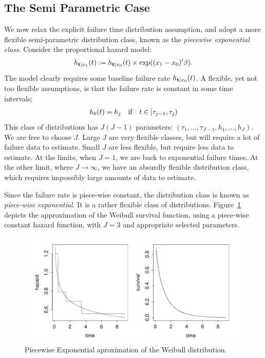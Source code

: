\subsection{The Semi Parametric Case}
We now relax the explicit failure time distribution assumption, and adopt a more flexible semi-parametric distribution class, known as the \emph{piecewise exponential class}.
Consider the proportional hazard model:
\begin{align}
	h_{\mathbf{t}|x_1} (t):=h_{\mathbf{t}|x_0} (t) \times \exp((x_1-x_0)'\beta).
\end{align}
The model clearly requires some baseline failure rate $h_{\mathbf{t}|x_0} (t)$.
A flexible, yet not too flexible assumptions, is that the failure rate is constant in some time intervals:
\begin{align}
	h_{0} (t)=h_j \quad \text{if} \quad t\in [\tau_{j-1},\tau_j)
\end{align}
This class of distributions has $J(J-1)$ parameters: $(\tau_1,\dots,\tau_{J-1},h_1,\dots,h_J)$.
We are free to choose $J$. 
Large $J$ are very flexible classes, but will require a lot of failure data to estimate.
Small $J$ are less flexible, but require less data to estimate. 
At the limits, when $J=1$, we are back to exponential failure times. 
At the other limit, where $J \to \infty$, we have an absurdly flexible distribution class, which requires impossibly large amounts of data to estimate.

Since the failure rate is piece-wise constant, the distribution class is known as \emph{piece-wise exponential}.
It is a rather flexible class of distributions. Figure~\ref{fig:piecewise_exponential} depicts the approximation of the Weibull survival function, using a piece-wise constant hazard function, with $J=3$ and appropriate selected parameters.
\begin{figure}[ht]
\centering
\includegraphics[height=0.2\textheight]{art/piecewise_exponential}
\caption{Piecewise Exponential aproximation of the Weibull distribution.}
\label{fig:piecewise_exponential}
\end{figure}


